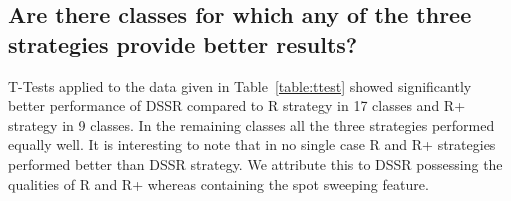 \documentclass[conference]{IEEEtran}
\begin{document}
\subsection{Are there classes for which any of the three strategies provide better results?}


T-Tests applied to the data given in Table~\ref{table:ttest} showed significantly better performance of DSSR compared to R strategy in 17 classes and R+ strategy in 9 classes. In the remaining classes all the three strategies performed equally well. It is interesting to note that in no single case R and R+ strategies performed better than DSSR strategy. We attribute this to DSSR possessing the qualities of R and R+ whereas containing the spot sweeping feature.
\end{document}
